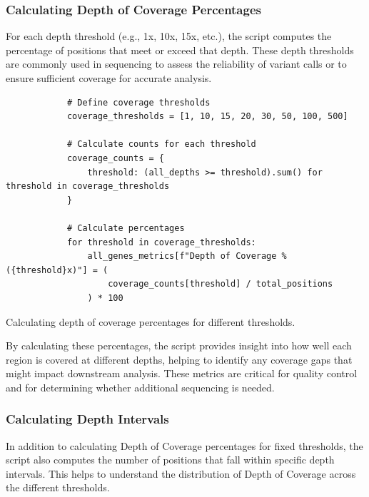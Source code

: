 \subsubsection{\textbf{Calculating Depth of Coverage Percentages}}

For each depth threshold (e.g., 1x, 10x, 15x, etc.), the script computes the percentage of positions that meet or exceed that depth. These depth thresholds are commonly used in sequencing to assess the reliability of variant calls or to ensure sufficient coverage for accurate analysis.

\begin{longlisting}
\begin{verbatim}
            # Define coverage thresholds
            coverage_thresholds = [1, 10, 15, 20, 30, 50, 100, 500]

            # Calculate counts for each threshold
            coverage_counts = {
                threshold: (all_depths >= threshold).sum() for threshold in coverage_thresholds
            }

            # Calculate percentages
            for threshold in coverage_thresholds:
                all_genes_metrics[f"Depth of Coverage % ({threshold}x)"] = (
                    coverage_counts[threshold] / total_positions
                ) * 100
\end{verbatim}
\caption{Calculating depth of coverage percentages for different thresholds.}
\label{lbl:metrics_coverage}
\end{longlisting}

By calculating these percentages, the script provides insight into how well each region is covered at different depths, helping to identify any coverage gaps that might impact downstream analysis. These metrics are critical for quality control and for determining whether additional sequencing is needed.

\subsubsection{\textbf{Calculating Depth Intervals}}

In addition to calculating Depth of Coverage percentages for fixed thresholds, the script also computes the number of positions that fall within specific depth intervals. This helps to understand the distribution of Depth of Coverage across the different thresholds.

